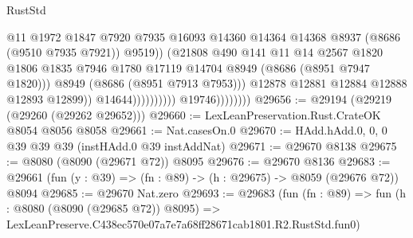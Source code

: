 \begin{lexlean}{RustStd}
\begin{coremodule}
                                                  @11
                                                  @1972
                                                  @1847
                                                  @7920
                                                  @7935
                                                  @16093
                                                  @14360
                                                  @14364
                                                  @14368
                                                  @8937
                                                  (@8686 (@9510 @7935 @7921))
                                                  @9519))
                                              (@21808
                                                @490
                                                @141
                                                @11
                                                @14
                                                @2567
                                                @1820
                                                @1806
                                                @1835
                                                @7946
                                                @1780
                                                @17119
                                                @14704
                                                @8949
                                                (@8686 (@8951 @7947 @1820)))
                                              @8949
                                              (@8686 (@8951 @7913 @7953)))
                                            @12878
                                            @12881
                                            @12884
                                            @12888
                                            @12893
                                            @12899))
                                        @14644))))))))))
                    @19746))))))))
@29656 := @29194 (@29219 (@29260 (@29262 @29652)))
@29660 := LexLeanPreservation.Rust.CrateOK @8054 @8056 @8058
@29661 := Nat.casesOn.{0}
@29670 := HAdd.hAdd.{0, 0, 0} @39 @39 @39 (instHAdd.{0} @39 instAddNat)
@29671 := @29670 @8138
@29675 := @8080 (@8090 (@29671 @72)) @8095
@29676 := @29670 @8136
@29683 := @29661 (fun (y : @39) => (fn : @89) -> (h : @29675) -> @8059 (@29676 @72)) @8094
@29685 := @29670 Nat.zero
@29693 := @29683
    (fun (fn : @89) =>
    fun (h : @8080 (@8090 (@29685 @72)) @8095) =>
    LexLeanPreserve.C438ec570e07a7e7a68ff28671cab1801.R2.RustStd.fun0)

\end{coremodule}
\end{lexlean}
